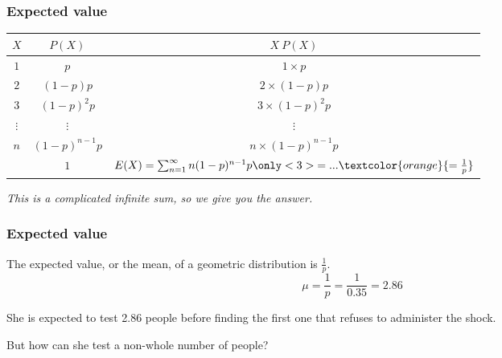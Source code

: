 \documentclass[slidestop,compress,mathserif]{beamer}
\begin{document}
\begin{frame}
\frametitle{Expected value}


\pause

\begin{center}
\renewcommand{\arraystretch}{1.5}
\begin{tabular}{c | c | c }
$X$   & $P(X)$              & $X ~ P(X)$         \\
\hline
$1$   & $p$                 & $1 \times p$       \\
$2$   & $(1-p)p$            & $2 \times (1-p)p$  \\
$3$   & $(1-p)^2 p$         & $3 \times (1-p)^2 p$ \\
$\vdots$   & $\vdots$       & $\vdots$           \\
$n$   & $(1-p)^{n-1} p$     & $n \times (1-p)^{n-1} p$ \\
\hline
      & $1$                 & $E(X) = \sum_{n=1}^{\infty} n (1-p)^{n-1} p \only<3>{=... \textcolor{orange}{= \frac{1}{p}}}$ \\
\end{tabular}
\end{center}
\pause

\textit{This is a complicated infinite sum, so we give you the answer.}

\end{frame}



\begin{frame}
\frametitle{Expected value}


The expected value, or the mean, of a geometric distribution is $\frac{1}{p}$.
\[ \mu = \frac{1}{p} = \frac{1}{0.35} = 2.86 \]

\pause

She is expected to test 2.86 people before finding the first one that refuses to administer the shock. 

\pause

But how can she test a non-whole number of people?

\end{frame}

\end{document}
